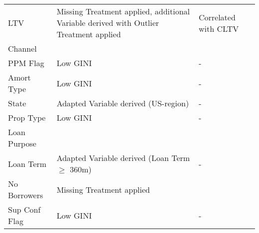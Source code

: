 \begin{longtable}{ l p{5.5cm} p{5.5cm} }
LTV                         & \cellcolor[HTML]{B4EDB3}Missing Treatment applied, additional Variable derived with Outlier Treatment applied & \cellcolor[HTML]{EDA8A0}Correlated with CLTV                                                       \\
Channel                     & \cellcolor[HTML]{B4EDB3}                                                                                      & \cellcolor[HTML]{B4EDB3}                                                                           \\
PPM Flag                    & \cellcolor[HTML]{EDA8A0}Low GINI                                                                              & -                                                                                                  \\
Amort Type                  & \cellcolor[HTML]{EDA8A0}Low GINI                                                                              & -                                                                                                  \\
State                       & \cellcolor[HTML]{EDA8A0}Adapted Variable derived (US-region)                                                  & -                                                                                                  \\
Prop Type                   & \cellcolor[HTML]{EDA8A0}Low GINI                                                                              & -                                                                                                  \\
Loan Purpose                & \cellcolor[HTML]{B4EDB3}                                                                                      & \cellcolor[HTML]{B4EDB3}                                                                           \\
Loan Term                   & \cellcolor[HTML]{EDA8A0}Adapted Variable derived (Loan Term $\geq$ 360m)                                      & -                                                                                                  \\
No Borrowers                & \cellcolor[HTML]{B4EDB3}Missing Treatment applied                                                             & \cellcolor[HTML]{B4EDB3}                                                                           \\
Sup Conf Flag               & \cellcolor[HTML]{EDA8A0}Low GINI                                                                              & -                                                                                                  \\

\end{longtable}
